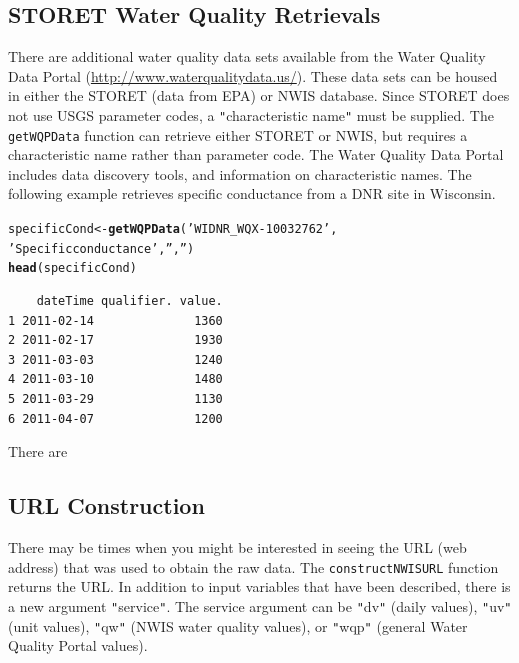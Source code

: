 \documentclass[a4paper,11pt]{article}\usepackage[]{graphicx}\usepackage[]{color}
\makeatletter
\newcommand{\hlstr}[1]{\textcolor[rgb]{0.192,0.494,0.8}{#1}}%
\newcommand{\hlstd}[1]{\textcolor[rgb]{0.345,0.345,0.345}{#1}}%
\newcommand{\hlkwb}[1]{\textcolor[rgb]{0.69,0.353,0.396}{#1}}%
\newcommand{\hlkwd}[1]{\textcolor[rgb]{0.737,0.353,0.396}{\textbf{#1}}}%
\newenvironment{kframe}{%
 \def\at@end@of@kframe{}%
 \ifinner\ifhmode%
  \def\at@end@of@kframe{\end{minipage}}%
  \begin{minipage}{\columnwidth}%
 \fi\fi%
 \def\FrameCommand##1{\hskip\@totalleftmargin \hskip-\fboxsep
 \colorbox{shadecolor}{##1}\hskip-\fboxsep
     \hskip-\linewidth \hskip-\@totalleftmargin \hskip\columnwidth}%
 \MakeFramed {\advance\hsize-\width
   \@totalleftmargin\z@ \linewidth\hsize
   \@setminipage}}%
 {\par\unskip\endMakeFramed%
 \at@end@of@kframe}
\newenvironment{knitrout}{}{} %
\makeatother
\begin{document}
\subsection{STORET Water Quality Retrievals}
\label{sec:usgsSTORET}
There are additional water quality data sets available from the Water Quality Data Portal (\url{http://www.waterqualitydata.us/}).  These data sets can be housed in either the STORET (data from EPA) or NWIS database.  Since STORET does not use USGS parameter codes, a \texttt{"}characteristic name\texttt{"} must be supplied.  The \texttt{getWQPData} function can retrieve either STORET or NWIS, but requires a characteristic name rather than parameter code. The Water Quality Data Portal includes data discovery tools, and information on characteristic names. The following example retrieves specific conductance from a DNR site in Wisconsin. 


\begin{knitrout}
\color{fgcolor}\begin{kframe}
\begin{alltt}
\hlstd{specificCond} \hlkwb{<-} \hlkwd{getWQPData}\hlstd{(}\hlstr{'WIDNR_WQX-10032762'}\hlstd{,}
                \hlstr{'Specific conductance'}\hlstd{,}\hlstr{''}\hlstd{,}\hlstr{''}\hlstd{)}
\hlkwd{head}\hlstd{(specificCond)}
\end{alltt}
\begin{verbatim}
    dateTime qualifier. value.
1 2011-02-14              1360
2 2011-02-17              1930
3 2011-03-03              1240
4 2011-03-10              1480
5 2011-03-29              1130
6 2011-04-07              1200
\end{verbatim}
\end{kframe}
\end{knitrout}

There are 

\FloatBarrier
\subsection{URL Construction}
\label{sec:usgsURL}
There may be times when you might be interested in seeing the URL (web address) that was used to obtain the raw data. The \texttt{constructNWISURL} function returns the URL.  In addition to input variables that have been described, there is a new argument \texttt{"}service\texttt{"}. The service argument can be \texttt{"}dv\texttt{"} (daily values), \texttt{"}uv\texttt{"} (unit values), \texttt{"}qw\texttt{"} (NWIS water quality values), or \texttt{"}wqp\texttt{"} (general Water Quality Portal values).
 
\end{document}
